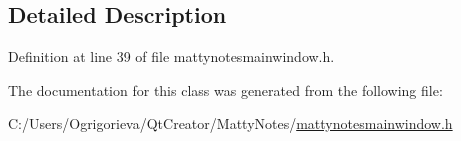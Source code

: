 \subsection{Detailed Description}


Definition at line 39 of file mattynotesmainwindow.\+h.



The documentation for this class was generated from the following file\+:\begin{DoxyCompactItemize}
\item 
C\+:/\+Users/\+Ogrigorieva/\+Qt\+Creator/\+Matty\+Notes/\hyperlink{mattynotesmainwindow_8h}{mattynotesmainwindow.\+h}\end{DoxyCompactItemize}
